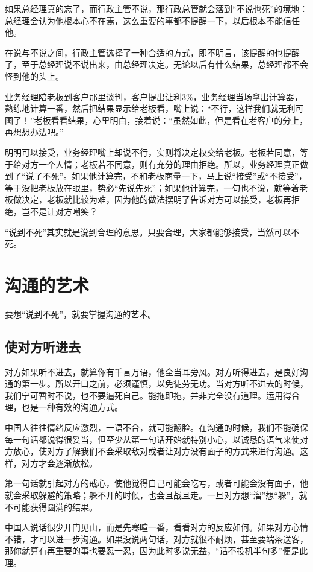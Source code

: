 \documentclass[fontset=fandol, a4paper, 12pt, openright]{ctexbook}
\begin{document}
如果总经理真的忘了，而行政主管不说，那行政总管就会落到“不说也死”的境地：总经理会认为他根本心不在焉，这么重要的事都不提醒一下，以后根本不能信任他。

在说与不说之间，行政主管选择了一种合适的方式，即不明言，该提醒的也提醒了，至于总经理说不说出来，由总经理决定。无论以后有什么结果，总经理都不会怪到他的头上。

业务经理陪老板到客户那里谈判，客户提出让利3\%，业务经理当场拿出计算器，熟练地计算一番，然后把结果显示给老板看，嘴上说：“不行，这样我们就无利可图了！”老板看看结果，心里明白，接着说：“虽然如此，但是看在老客户的分上，再想想办法吧。”

明明可以接受，业务经理嘴上却说不行，实则将决定权交给老板。老板若同意，等于给对方一个人情；老板若不同意，则有充分的理由拒绝。所以，业务经理真正做到了“说了不死”。如果他计算完，不和老板商量一下，马上说“接受”或“不接受”，等于没把老板放在眼里，势必“先说先死”；如果他计算完，一句也不说，就等着老板做决定，老板就比较为难，因为他的做法摆明了告诉对方可以接受，老板再拒绝，岂不是让对方嘲笑？

“说到不死”其实就是说到合理的意思。只要合理，大家都能够接受，当然可以不死。


\chapter{沟通的艺术}
要想“说到不死”，就要掌握沟通的艺术。

\section{使对方听进去}

对方如果听不进去，就算你有千言万语，他全当耳旁风。对方听得进去，是良好沟通的第一步。所以开口之前，必须谨慎，以免徒劳无功。当对方听不进去的时候，我们宁可暂时不说，也不要逼死自己。能拖即拖，并非完全没有道理。运用得合理，也是一种有效的沟通方式。

中国人往往情绪反应激烈，一语不合，就可能翻脸。在沟通的时候，我们不能确保每一句话都说得很妥当，但至少从第一句话开始就特别小心，以诚恳的语气来使对方放心，使对方了解我们不会采取敌对或者让对方没有面子的方式来进行沟通。这样，对方才会逐渐放松。

第一句话就引起对方的戒心，使他觉得自己可能会吃亏，或者可能会没有面子，他就会采取躲避的策略；躲不开的时候，也会且战且走。一旦对方想“溜”想“躲”，就不可能获得圆满的结果。

中国人说话很少开门见山，而是先寒暄一番，看看对方的反应如何。如果对方心情不错，才可以进一步沟通。如果没说两句话，对方就很不耐烦，甚至要端茶送客，那你就算有再重要的事也要忍一忍，因为此时多说无益，“话不投机半句多”便是此理。
\end{document}
